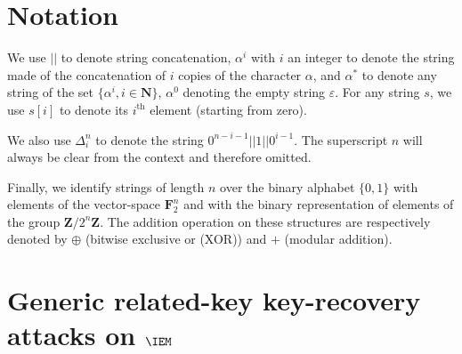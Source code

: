 
\section{Notation}

We use $||$ to denote string concatenation, $\alpha^i$ with $i$ an integer
to denote the string
made of the concatenation of $i$ copies of the character $\alpha$, and $\alpha^*$
to denote any string of the set $\{\alpha^i, i \in \mathbf{N}\}$, $\alpha^0$
denoting the empty string $\varepsilon$. For any string $s$, we use
$s[i]$ to denote its $i^\text{th}$ element (starting from zero).

We also use $\Delta_i^n$ to denote the string
$0^{n-i-1} || 1 || 0^{i - 1}$. The superscript $n$ will always
be clear from the context and therefore omitted.

Finally, we identify strings of length $n$ over the binary alphabet $\{0,1\}$ with elements of
the vector-space $\mathbf{F}_2^n$ and with the binary representation of elements of
the group $\mathbf{Z}/2^n\mathbf{Z}$. The addition operation on these structures
are respectively denoted by $\oplus$ (bitwise exclusive or (XOR)) and $+$ (modular addition).

\section{Generic related-key key-recovery attacks on $\IEM$}
\label{sec:gen}


